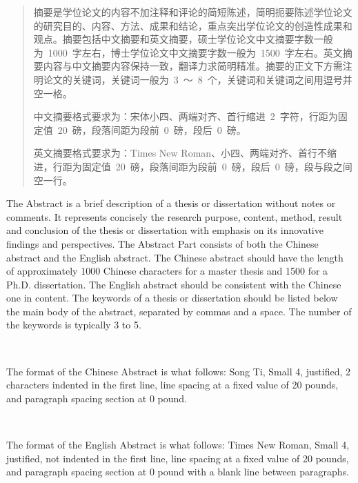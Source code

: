 
\begin{abstract}
摘要是学位论文的内容不加注释和评论的简短陈述，简明扼要陈述学位论文的研究目的、内容、方法、成果和结论，重点突出学位论文的创造性成果和观点。摘要包括中文摘要和英文摘要，硕士学位论文中文摘要字数一般为~1000~字左右，博士学位论文中文摘要字数一般为~1500~字左右。英文摘要内容与中文摘要内容保持一致，翻译力求简明精准。摘要的正文下方需注明论文的关键词，关键词一般为~3~～~8~个，关键词和关键词之间用逗号并空一格。\par
中文摘要格式要求为：宋体小四、两端对齐、首行缩进~2~字符，行距为固定值~20~磅，段落间距为段前~0~磅，段后~0~磅。\par
英文摘要格式要求为：Times New Roman、小四、两端对齐、首行不缩进，行距为固定值~20~磅，段落间距为段前~0~磅，段后~0~磅，段与段之间空一行。\par

 \par
\end{abstract}

\begin{englishabstract}
The Abstract is a brief description of a thesis or dissertation without notes or comments. It represents concisely the research purpose, content, method, result and conclusion of the thesis or dissertation with emphasis on its innovative findings and perspectives. The Abstract Part consists of both the Chinese abstract and the English abstract. The Chinese abstract should have the length of approximately 1000 Chinese characters for a master thesis and 1500 for a Ph.D. dissertation. The English abstract should be consistent with the Chinese one in content. The keywords of a thesis or dissertation should be listed below the main body of the abstract, separated by commas and a space. The number of the keywords is typically 3 to 5.
\par~\par
The format of the Chinese Abstract is what follows: Song Ti, Small 4, justified, 2 characters indented in the first line, line spacing at a fixed value of 20 pounds, and paragraph spacing section at 0 pound.
\par~\par
The format of the English Abstract is what follows: Times New Roman, Small 4, justified, not indented in the first line, line spacing at a fixed value of 20 pounds, and paragraph spacing section at 0 pound with a blank line between paragraphs.
~\par
{} \par

\end{englishabstract}

